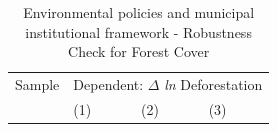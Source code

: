     \begin{table}[htpb!]
\caption{Environmental policies and municipal institutional framework - Robustness Check for Forest Cover}
\footnotesize
       \begin{tabularx}{\columnwidth}{l XXX}
     \hline
     \hline
      Sample & \multicolumn{3}{l}{Dependent: $\Delta$ \textit{ln} Deforestation} \\ \cline{2-3} \cline{3-4}
      & (1) & (2) & (3)  \\
      \hline

\end{tabularx}
\end{table}
